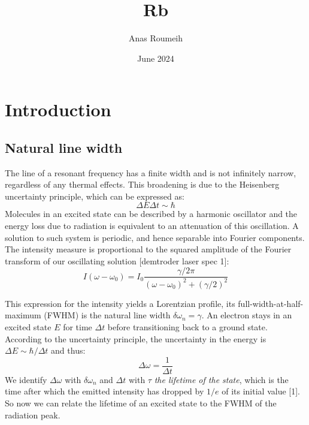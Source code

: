 \documentclass{article}
\title{Rb}
\author{Anas Roumeih}
\date{June 2024}
\begin{document}
\maketitle

\section{Introduction}
\subsection{Natural line width}
The line of a resonant frequency has a finite width and is not infinitely narrow, regardless of any thermal effects. This broadening is due to the Heisenberg uncertainty principle, which can be expressed as: 
\begin{equation}
    \Delta E\Delta t \sim \hbar
\end{equation}
Molecules in an excited state can be described by a harmonic oscillator and the energy loss due to radiation is equivalent to an attenuation of this oscillation. A solution to such system is periodic, and hence separable into Fourier components. The intensity measure is proportional to the squared amplitude of the Fourier transform of our oscillating solution [demtroder laser spec 1]: 
\begin{equation}
    I(\omega-\omega_0) = I_0\frac{\gamma/2\pi}{(\omega-\omega_0)^2+(\gamma/2)^2}
\end{equation}

This expression for the intensity yields a Lorentzian profile, its full-width-at-half-maximum (FWHM) is the natural line width $\delta\omega_n = \gamma$. An electron stays in an excited state $E$ for time $\Delta t$ before transitioning back to a ground state. According to the uncertainty principle, the uncertainty in the energy is $\Delta E\sim \hbar/\Delta t$ and thus: 
\begin{equation}
    \Delta\omega = \frac{1}{\Delta t}
\end{equation}
We identify $\Delta\omega$ with $\delta\omega_n$ and $\Delta t$ with $\tau$ \textit{the lifetime of the state}, which is the time after which the emitted intensity has dropped by $1/e$ of its initial value [1]. So now we can relate the lifetime of an excited state to the FWHM of the radiation peak. 
\end{document}
